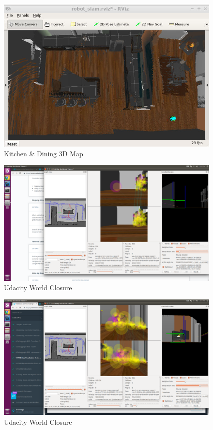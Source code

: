 \documentclass[10pt,journal,compsoc]{IEEEtran}
\begin{document}
\begin{figure}
    \centering
    \includegraphics[width=\linewidth]{workspace_benchmark_crop}
    \caption{Kitchen \& Dining 3D Map}
    \label{fig:dining_3d}
\end{figure}

\begin{figure}
    \centering
    \includegraphics[width=\linewidth]{closure_1}
    \caption{Udacity World Closure}
    \label{fig:closure 1}
\end{figure}

\begin{figure}
    \centering
    \includegraphics[width=\linewidth]{closure_2}
    \caption{Udacity World Closure}
    \label{fig:closure 2}
\end{figure}
\end{document}
